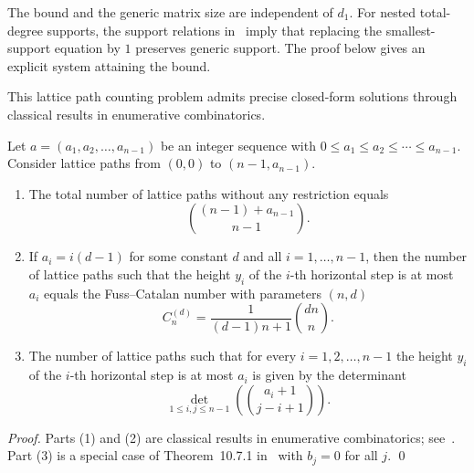 \begin{remark}\label{rem:minimum_degree}
The bound and the generic matrix size are independent of $d_1$. For nested total-degree supports, the support relations in~\cite[Theorems~3.1 and~5.1]{ChtcherbaKapur2004} imply that replacing the smallest-support equation by $1$ preserves generic support. The proof below gives an explicit system attaining the bound.
\end{remark}

This lattice path counting problem admits precise closed-form solutions through classical results in enumerative combinatorics.

\begin{lemma}\label{lem:lattice_path_formulas}
	Let $a = (a_1, a_2, \ldots, a_{n-1})$ be an integer sequence with
	$0 \le a_1 \le a_2 \le \cdots \le a_{n-1}$.
	Consider lattice paths from $(0,0)$ to $(n-1,a_{n-1})$.
	
	\begin{enumerate}
		
		\item[(1)] %
		The total number of lattice paths without any restriction equals
		\[
		\binom{(n-1)+a_{n-1}}{n-1}.
		\]
		
		\item[(2)] %
		If $a_i = i(d-1)$ for some constant $d$ and all $i=1,\ldots,n-1$, 
		then the number of lattice paths such that the height $y_i$ of the $i$-th horizontal step is at most $a_i$ equals the Fuss--Catalan number with parameters $(n,d)$
		\begin{equation}\label{eq:fuss_catalan}
			C_n^{(d)} = \frac{1}{(d-1)n+1}\binom{dn}{n}.
		\end{equation}
		
		\item[(3)] %
		The number of lattice paths such that for every 
		$i=1,2,\ldots,n-1$ the height $y_i$ of the $i$-th horizontal step is at most $a_i$ is given by the determinant
		\[
		\det_{1\le i,j\le n-1}
		\left(
		\binom{a_i+1}{j-i+1}
		\right).
		\]
		
	\end{enumerate}
\end{lemma}

\begin{proof}
	Parts (1) and (2) are classical results in enumerative combinatorics; see~\cite{hilton1991catalan,DBLP:journals/dm/Aval08}. Part (3) is a special case of Theorem~10.7.1 in~\cite{bona2015handbook} with $b_j = 0$ for all $j$.
\qed
\end{proof}

